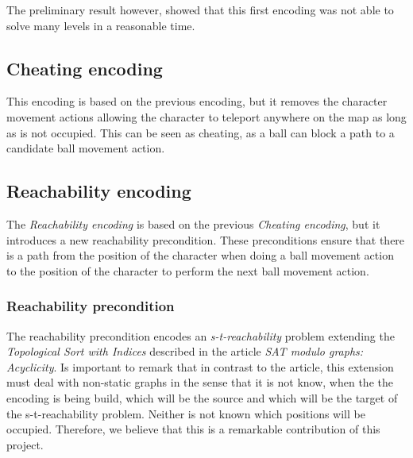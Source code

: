 \documentclass{report}
\theoremstyle{plain}
\begin{document}
The preliminary result however, showed that this first encoding was not able to solve many levels in a reasonable time.

\subsection{Cheating encoding}
This encoding is based on the previous encoding, but it removes the character movement actions allowing the character to teleport anywhere on the map as long as is not occupied. This can be seen as cheating, as a ball can block a path to a candidate ball movement action.


\subsection{Reachability encoding}
The \emph{Reachability encoding} is based on the previous \emph{Cheating encoding}, but it introduces a new reachability precondition. These preconditions ensure that there is a path from the position of the character when doing a ball movement action to the position of the character to perform the next ball movement action. 

\subsubsection{Reachability precondition}
The reachability precondition encodes an \emph{s-t-reachability} problem extending the \emph{Topological Sort with Indices} described in the article \emph{SAT modulo graphs: Acyclicity}. Is important to remark that in contrast to the article, this extension must deal with non-static graphs in the sense that it is not know, when the the encoding is being build, which will be the source and which will be the target of the s-t-reachability problem. Neither is not known which positions will be occupied. Therefore, we believe that this is a remarkable contribution of this project.
\end{document}
